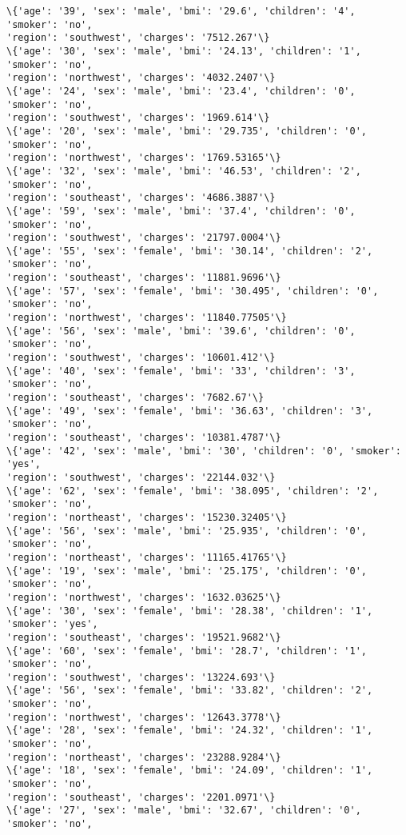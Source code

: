 \documentclass[11pt]{article}
\begin{document}
\begin{Verbatim}[commandchars=\\\{\}]
\{'age': '39', 'sex': 'male', 'bmi': '29.6', 'children': '4', 'smoker': 'no',
'region': 'southwest', 'charges': '7512.267'\}
\{'age': '30', 'sex': 'male', 'bmi': '24.13', 'children': '1', 'smoker': 'no',
'region': 'northwest', 'charges': '4032.2407'\}
\{'age': '24', 'sex': 'male', 'bmi': '23.4', 'children': '0', 'smoker': 'no',
'region': 'southwest', 'charges': '1969.614'\}
\{'age': '20', 'sex': 'male', 'bmi': '29.735', 'children': '0', 'smoker': 'no',
'region': 'northwest', 'charges': '1769.53165'\}
\{'age': '32', 'sex': 'male', 'bmi': '46.53', 'children': '2', 'smoker': 'no',
'region': 'southeast', 'charges': '4686.3887'\}
\{'age': '59', 'sex': 'male', 'bmi': '37.4', 'children': '0', 'smoker': 'no',
'region': 'southwest', 'charges': '21797.0004'\}
\{'age': '55', 'sex': 'female', 'bmi': '30.14', 'children': '2', 'smoker': 'no',
'region': 'southeast', 'charges': '11881.9696'\}
\{'age': '57', 'sex': 'female', 'bmi': '30.495', 'children': '0', 'smoker': 'no',
'region': 'northwest', 'charges': '11840.77505'\}
\{'age': '56', 'sex': 'male', 'bmi': '39.6', 'children': '0', 'smoker': 'no',
'region': 'southwest', 'charges': '10601.412'\}
\{'age': '40', 'sex': 'female', 'bmi': '33', 'children': '3', 'smoker': 'no',
'region': 'southeast', 'charges': '7682.67'\}
\{'age': '49', 'sex': 'female', 'bmi': '36.63', 'children': '3', 'smoker': 'no',
'region': 'southeast', 'charges': '10381.4787'\}
\{'age': '42', 'sex': 'male', 'bmi': '30', 'children': '0', 'smoker': 'yes',
'region': 'southwest', 'charges': '22144.032'\}
\{'age': '62', 'sex': 'female', 'bmi': '38.095', 'children': '2', 'smoker': 'no',
'region': 'northeast', 'charges': '15230.32405'\}
\{'age': '56', 'sex': 'male', 'bmi': '25.935', 'children': '0', 'smoker': 'no',
'region': 'northeast', 'charges': '11165.41765'\}
\{'age': '19', 'sex': 'male', 'bmi': '25.175', 'children': '0', 'smoker': 'no',
'region': 'northwest', 'charges': '1632.03625'\}
\{'age': '30', 'sex': 'female', 'bmi': '28.38', 'children': '1', 'smoker': 'yes',
'region': 'southeast', 'charges': '19521.9682'\}
\{'age': '60', 'sex': 'female', 'bmi': '28.7', 'children': '1', 'smoker': 'no',
'region': 'southwest', 'charges': '13224.693'\}
\{'age': '56', 'sex': 'female', 'bmi': '33.82', 'children': '2', 'smoker': 'no',
'region': 'northwest', 'charges': '12643.3778'\}
\{'age': '28', 'sex': 'female', 'bmi': '24.32', 'children': '1', 'smoker': 'no',
'region': 'northeast', 'charges': '23288.9284'\}
\{'age': '18', 'sex': 'female', 'bmi': '24.09', 'children': '1', 'smoker': 'no',
'region': 'southeast', 'charges': '2201.0971'\}
\{'age': '27', 'sex': 'male', 'bmi': '32.67', 'children': '0', 'smoker': 'no',

\end{Verbatim}
\end{document}
